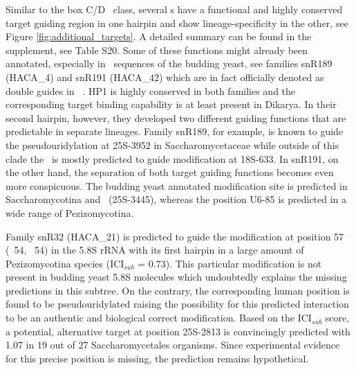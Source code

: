 Similar to the box C/D \sno\ class, several \haca s have a functional
and highly conserved target guiding region in one hairpin and show
lineage-specificity in the other, see Figure
\ref{fig:additional_targets}.  A detailed summary can be found in the
supplement, see Table S20. Some of these functions might already been
annotated, especially in \sno\ sequences of the budding yeast, see
families snR189 (HACA\_4) and snR191 (HACA\_42) which are in fact
officially denoted as double guides in \sce\ \cite{Badis:2003,
  Schattner:2004}.  HP1 is highly conserved in both families and the
corresponding target binding capability is at least present in
Dikarya. In their second hairpin, however, they developed two
different guiding functions that are predictable in separate
lineages. Family snR189, for example, is known to guide the
pseudouridylation at 25S-3952 in Saccharomycetaceae while outside of
this clade the \sno\ is mostly predicted to guide modification at
18S-633. In snR191, on the other hand, the separation of both target
guiding functions becomes even more conspicuous. The budding yeast
annotated modification site is predicted in Saccharomycotina and \Tde\
(25S-3445), whereas the position U6-85 is predicted in a wide range of
Pezizomycotina.

Family snR32 (HACA\_21) is predicted to guide the modification at
position 57 (\ncr\ 54, \sce\ 54) in the 5.8S rRNA with its first
hairpin in a large amount of Pezizomycotina species (ICI$_{sub}$ =
0.73). This particular modification is not present in budding yeast
5.8S molecules which undoubtedly explains the missing predictions in
this subtree. On the contrary, the corresponding human position is
found to be pseudouridylated raising the possibility for this
predicted interaction to be an authentic and biological correct
modification.  Based on the ICI$_{sub}$ score, a potential,
alternative target at position 25S-2813 is convincingly predicted with
1.07 in 19 out of 27 Saccharomycetales organisms. Since experimental
evidence for this precise position is missing, the prediction remains
hypothetical.


